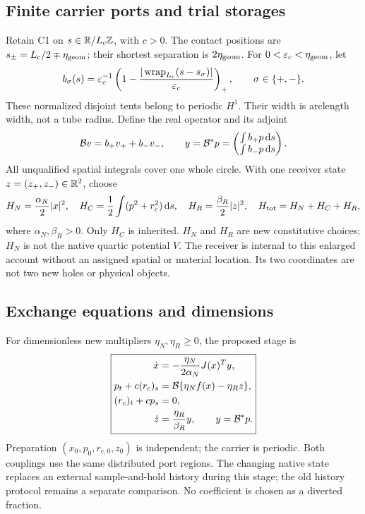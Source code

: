 \subsection{Finite carrier ports and trial storages}\label{sec:ports}
Retain C1 on $s\in\mathbb R/L_c\mathbb Z$, with $c>0$. The contact positions are $s_\pm=L_c/2\mp\eta_{\rm geom}$; their shortest separation is $2\eta_{\rm geom}$. For $0<\varepsilon_c<\eta_{\rm geom}$, let
\begin{equation}\label{eq:tents}
 b_\sigma(s)=\varepsilon_c^{-1}
 \left(1-\frac{|\operatorname{wrap}_{L_c}(s-s_\sigma)|}{\varepsilon_c}\right)_+,
 \qquad \sigma\in\{+,-\}.
\end{equation}
These normalized disjoint tents belong to periodic $H^1$. Their width is arclength width, not a tube radius. Define the real operator and its adjoint
\begin{equation}\label{eq:ports}
 \mathcal B v=b_+v_++b_-v_-,\qquad
 y=\mathcal B^*p=\begin{pmatrix}\int b_+p\,\mathrm d s\\\int b_-p\,\mathrm d s\end{pmatrix}.
\end{equation}
All unqualified spatial integrals cover one whole circle. With one receiver state $z=(z_+,z_-)\in\mathbb R^2$, choose
\begin{equation}\label{eq:storages}
 H_N=\frac{\alpha_N}{2}|x|^2,\quad
 H_C=\frac12\int(p^2+r_c^2)\,\mathrm d s,\quad
 H_R=\frac{\beta_R}{2}|z|^2,\quad H_{\rm tot}=H_N+H_C+H_R,
\end{equation}
where $\alpha_N,\beta_R>0$. Only $H_C$ is inherited. $H_N$ and $H_R$ are new constitutive choices; $H_N$ is not the native quartic potential $V$. The receiver is internal to this enlarged account without an assigned spatial or material location. Its two coordinates are not two new holes or physical objects.

\subsection{Exchange equations and dimensions}\label{sec:exchange}
For dimensionless new multipliers $\eta_N,\eta_R\ge0$, the proposed stage is
\begin{equation}\label{eq:system}
\boxed{\begin{aligned}
 \dot x&=-\frac{\eta_N}{2\alpha_N}J(x)^Ty,\\
 p_t+c(r_c)_s&=\mathcal B\{\eta_Nf(x)-\eta_Rz\},\\
 (r_c)_t+cp_s&=0,\\
 \dot z&=\frac{\eta_R}{\beta_R}y,\qquad y=\mathcal B^*p.
\end{aligned}}
\end{equation}
Preparation $(x_0,p_0,r_{c,0},z_0)$ is independent; the carrier is periodic. Both couplings use the same distributed port regions. The changing native state replaces an external sample-and-hold history during this stage; the old history protocol remains a separate comparison. No coefficient is chosen as a diverted fraction.

